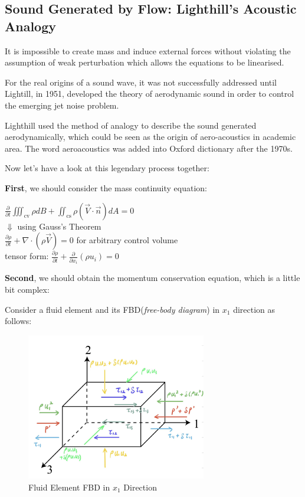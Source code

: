 \documentclass[graybox]{svmult}
\begin{document}
\subsection{Sound Generated by Flow: Lighthill's Acoustic Analogy}
\label{subsec:2}
It is impossible to create mass and induce external forces without violating the assumption of weak perturbation which allows the equations to be linearised. 

For the real origins of a sound wave, it was not successfully addressed until Lightill, in 1951, developed the theory of aerodynamic sound in order to control the emerging jet noise problem.

Lighthill used the method of analogy to describe the sound generated aerodynamically, which could be seen as the origin of aero-acoustics in academic area. The word aeroacoustics was added into Oxford dictionary after the 1970s.

Now let's have a look at this legendary process together:

\textbf{First}, we should consider the mass continuity equation:
\begin{center}
     $ \frac{\partial}{\partial t} \iiint_{\mathrm{cv}} \rho d B+\iint_{\mathrm{cs}} \rho(\vec{V} \cdot \vec{n}) d A=0 $ \\
     $ \Downarrow $ using Gauss's Theorem \\
     $ \frac{\partial \rho}{\partial t}+\nabla \cdot(\rho \vec{V})=0 $ for arbitrary control volume \\
     tensor form: $ \frac{\partial \rho}{\partial t}+\frac{\partial }{\partial x_i}(\rho u_i)=0 $
\end{center}

\textbf{Second}, we should obtain the momentum conservation equation, which is a little bit complex: \

Consider a fluid element and its FBD(\textit{free-body diagram}) in $ x_1$ direction as follows:
\begin{figure}[h!]
    \centering
    \includegraphics[width=0.7\textwidth]{Fig.Conservation of Momentum.jpg} %
    \caption{Fluid Element FBD in $ x_1$ Direction}
    \label{fig:example}
\end{figure}
\end{document}
